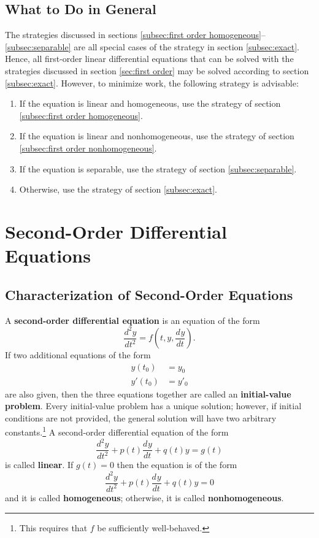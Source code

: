 \documentclass{myart}
\newcommand{\term}[1]{\textbf{#1}}
\newcommand{\deriv}[3][]{\frac{d^{#1}#2}{d#3^{#1}}}
\begin{document}
\subsection{What to Do in General} \label{subsec:first order strategy}

The strategies discussed in sections \ref{subsec:first order homogeneous}--\ref{subsec:separable} are all special cases of the strategy in section \ref{subsec:exact}. Hence, all first-order linear differential equations that can be solved with the strategies discussed in section \ref{sec:first order} may be solved according to section \ref{subsec:exact}. However, to minimize work, the following strategy is advisable:
\begin{enumerate}
\item If the equation is linear and homogeneous, use the strategy of section \ref{subsec:first order homogeneous}.
\item If the equation is linear and nonhomogeneous, use the strategy of section \ref{subsec:first order nonhomogeneous}.
\item If the equation is separable, use the strategy of section \ref{subsec:separable}.
\item Otherwise, use the strategy of section \ref{subsec:exact}.
\end{enumerate}

\section{Second-Order Differential Equations} \label{sec:second order}

\subsection{Characterization of Second-Order Equations} \label{subsec:second order characterization}

A \term{second-order differential equation} is an equation of the form
\begin{equation*}
\deriv[2]{y}{t} = f\left(t, y, \deriv{y}{t}\right).
\end{equation*}
If two additional equations of the form
\begin{align*}
y(t_0) &= y_0 \\
y'(t_0) &= y'_0
\end{align*}
are also given, then the three equations together are called an \term{initial-value problem}. Every initial-value problem has a unique solution; however, if initial conditions are not provided, the general solution will have two arbitrary constants.\footnote{This requires that $f$ be sufficiently well-behaved.} A second-order differential equation of the form
\begin{equation} \label{eq:second order nonhomogeneous}
\deriv[2]{y}{t} + p(t)\deriv{y}{t} + q(t)y = g(t)
\end{equation}
is called \term{linear}. If $g(t) = 0$ then the equation is of the form
\begin{equation} \label{eq:second order homogeneous}
\deriv[2]{y}{t} + p(t)\deriv{y}{t} + q(t)y = 0
\end{equation}
and it is called \term{homogeneous}; otherwise, it is called \term{nonhomogeneous}.
\end{document}
